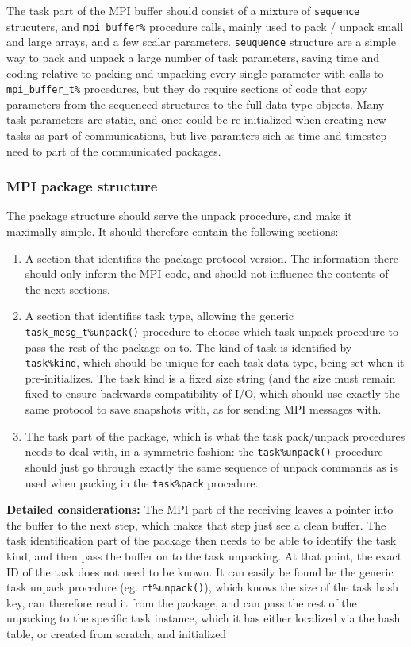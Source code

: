 \documentclass[paper=a4,fontsize=11pt]{scrartcl}
\numberwithin{equation}{section}		%
\numberwithin{figure}{section}			%
\numberwithin{table}{section}				%
\begin{document}
The task part of the MPI buffer should consist of a mixture of \verb|sequence| strucuters, and \verb|mpi_buffer%| procedure calls, mainly used to pack / unpack small and large arrays, and a few scalar parameters.  \verb|seuquence| structure are a simple way to pack and unpack a large number of task parameters, saving time and coding relative to packing and unpacking every single parameter with calls to \verb|mpi_buffer_t%| procedures, but they do require sections of code that copy parameters from the sequenced structures to the full data type objects.   Many task parameters are static, and once could be re-initialized when creating new tasks as part of communications, but live paramters sich as time and timestep need to part of the communicated packages.

\subsubsection{MPI package structure}
The package structure should serve the unpack procedure, and make it maximally simple. It should therefore contain the following sections:
\begin{enumerate}
    \item A section that identifies the package protocol version.  The information there should only inform the MPI code, and should not influence the contents of the next sections.
    \item A section that identifies task type, allowing the generic \verb|task_mesg_t%unpack()| procedure to choose which task unpack procedure to pass the rest of the package on to.  The kind of task is identified by \verb|task%kind|, which should be unique for each task data type, being set when it pre-initializes.  The task kind is a fixed size string (and the size must remain fixed to ensure backwards compatibility of I/O, which should use exactly the same protocol to save snapshots with, as for sending MPI messages with.
    \item The task part of the package, which is what the task pack/unpack procedures needs to deal with, in a symmetric fashion: the \verb|task%unpack()| procedure should just go through exactly the same sequence of unpack commands as is used when packing in the \verb|task%pack| procedure.
\end{enumerate}
\textbf{Detailed considerations:} The MPI part of the receiving leaves a pointer into the buffer to the next step, which makes that step just see a clean buffer.  The task identification part of the package then needs to be able to identify the task kind, and then pass the buffer on to the task unpacking.  At that point, the exact ID of the task does not need to be known.  It can easily be found be the generic task unpack procedure (eg. \verb|rt%unpack()|), which knows the size of the task hash key, can therefore read it from the package, and can pass the rest of the unpacking to the specific task instance, which it has either localized via the hash table, or created from scratch, and initialized
\end{document}
